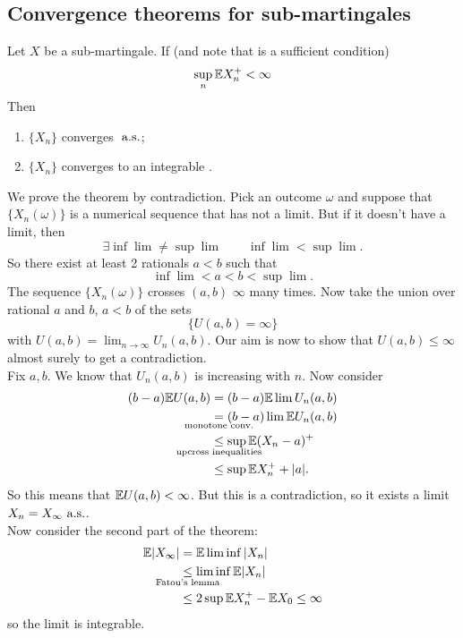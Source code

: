 \documentclass{report}
\begin{document}
\subsection{Convergence theorems for sub-martingales}
\begin{theorem}
	Let $X$ be a sub-martingale. If (and note that is a sufficient condition)
	\begin{equation*}
		\sup_{n}\mathbb{E} X_{n}^{+}<\infty
	\end{equation*}
	Then
	\begin{enumerate}
		\item $\{X_{n}\}$ converges $\text{ a.s.}$;
		\item $\{X_{n}\}$ converges to an integrable \rv.
	\end{enumerate}
\end{theorem}
\begin{fancyproof}
	We prove the theorem by contradiction. Pick an outcome $\omega$ and suppose that $\{X_{n}(\omega)\}$ is a numerical sequence that has not a limit. But if it doesn't have a limit, then 
	\[\exists\inf\lim\neq\sup\lim\qquad\inf\lim<\sup\lim.\]
	So there exist at least 2 rationals $a<b$ such that
	\begin{equation*}
		\inf\lim<a<b<\sup\lim.
	\end{equation*}
	The sequence $\{X_{n}(\omega)\}$ crosses $(a,b)$ $\infty$ many times. Now take the union over rational $a$ and $b$, $a<b$ of the sets
	\begin{equation*}
		\{U(a,b)=\infty\}
	\end{equation*}
	with $U(a,b)=\lim_{n\to\infty}U_{n}(a,b)$. Our aim is now to show that $U(a,b)\leq\infty$ almost surely to get a contradiction.\\
	Fix $a,b$. We know that $U_{n}(a,b)$ is increasing with $n$. Now consider
	\begin{align*}
		(b-a)\ev U(a,b)&=(b-a)\ev\lim U_{n}(a,b)\\
		&\underset{\mathclap{\text{monotone conv.}}}{=}(b-a)\lim\ev U_{n}(a,b)\\
		&\underset{\mathclap{\text{upcross inequalities}}}{\leq}\sup\ev(X_n-a)^{+}\\
		&\leq \sup\ev X_{n}^{+}+|a|.
	\end{align*}
	So this means that $\mathbb{E} U(a,b)<\infty$. But this is a contradiction, so it exists a limit $X_{n}=X_{\infty}\text{ a.s.}$.\\
	Now consider the second part of the theorem:
	\begin{align*}
		\ev|X_{\infty}|&=\ev\lim\inf|X_{n}|\\
		&\underset{\mathclap{\text{Fatou's lemma}}}{\leq}\lim\inf\ev|X_{n}|\\
		&\leq 2\sup\ev X_{n}^{+}-\ev X_{0}\leq\infty
	\end{align*}
	so the limit is integrable.
\end{fancyproof}
\end{document}
